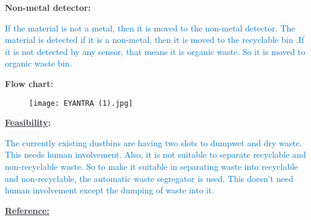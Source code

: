 \documentclass[12pt]{article}
\begin{document}
\textbf{\textcolor[HTML]{36363D}{Non-metal detector:}}\par

\textcolor[HTML]{0070C0}{If the material is not a metal, then it is moved to the non-metal detector. The material is detected if it is a non-metal, then it is moved to the recyclable bin .If it is not detected by any sensor, that means it is organic waste. So it is moved to organic waste bin. }\par


\vspace{\baselineskip}

\vspace{\baselineskip}
\textbf{\textcolor[HTML]{36363D}{Flow chart:}}\par



\begin{figure}[H]
\texttt{[image: EYANTRA (1).jpg]}
\end{figure}



\par



\vspace{\baselineskip}

\vspace{\baselineskip}
{\fontsize{14pt}{16.8pt}\selectfont \textbf{\textcolor[HTML]{36363D}{\uline{Feasibility}:}}\par}\par

\textcolor[HTML]{0070C0}{The currently existing dustbins are having two slots to dumpwet and dry waste. This needs human involvement. Also, it is not suitable to separate recyclable and non-recyclable waste. So to make it suitable in separating waste into recyclable and non-recyclable, the automatic waste segregator is used. This doesn't need human involvement except the dumping of waste into it.}\par


\vspace{\baselineskip}

\vspace{\baselineskip}
{\fontsize{14pt}{16.8pt}\selectfont \textbf{\textcolor[HTML]{36363D}{\uline{Reference:}}}\par}\par
\end{document}
